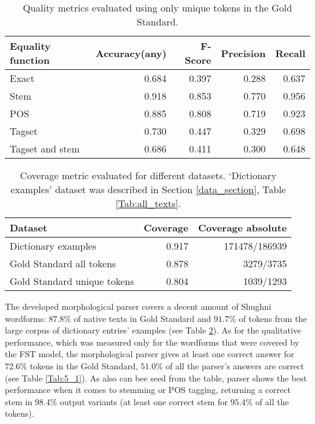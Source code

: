 \begin{table}[!htbp]
    \begin{center}
        \begin{tabular}{|l|r|r|r|r|}
            \hline
            \textbf{Equality function} & \textbf{Accuracy(any)} & \textbf{F-Score} & \textbf{Precision} & 
            \textbf{Recall} \\
            \hline
            \hline
            Exact           & 0.684 & 0.397 & 0.288 & 0.637 \\
            Stem            & 0.918 & 0.853 & 0.770 & 0.956 \\
            POS             & 0.885 & 0.808 & 0.719 & 0.923 \\
            Tagset          & 0.730 & 0.447 & 0.329 & 0.698 \\
            Tagset and stem & 0.686 & 0.411 & 0.300 & 0.648 \\
            \hline
        \end{tabular}
        \caption{Quality metrics evaluated using only unique tokens in the Gold Standard.}
        \label{Tab:5_2}
    \end{center}
\end{table}

\begin{table}[!htbp]
    \begin{center}
        \begin{tabular}{|l|r|r|}
            \hline
            \textbf{Dataset} & \textbf{Coverage} & \textbf{Coverage absolute} \\
            \hline
            \hline
            Dictionary examples         & 0.917 & 171478/186939 \\
            Gold Standard all tokens    & 0.878 & 3279/3735 \\
            Gold Standard unique tokens & 0.804 & 1039/1293 \\
            \hline
        \end{tabular}
        \caption{Coverage metric evaluated for different datasets. `Dictionary examples' dataset was described in Section \ref{data_section}, Table \ref{Tab:all_texts}.}
        \label{Tab:5_3}
    \end{center}
\end{table}

\FloatBarrier
The developed morphological parser covers a decent amount of Shughni wordforms: $87.8\%$ of native texts in Gold Standard and $91.7\%$ of tokens from the large corpus of dictionary entries' examples (see Table \ref{Tab:5_3}). As for the qualitative performance, which was measured only for the wordforms that were covered by the FST model, the morphological parser gives at least one correct answer for $72.6\%$ tokens in the Gold Standard, $51.0\%$ of all the parser's answers are correct (see Table \ref{Tab:5_1}). As also can bee seed from the table, parser shows the best performance when it comes to stemming or POS tagging, returning a correct stem in $98.4\%$ output variants (at least one correct stem for $95.4\%$ of all the tokens).

